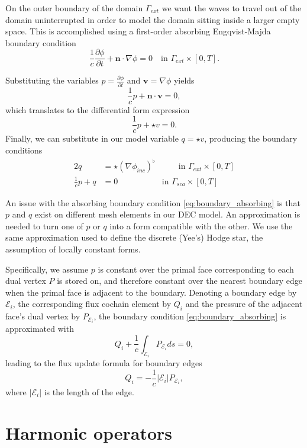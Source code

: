 \documentclass[utf8,english]{gradu3}
\begin{document}
On the outer boundary of the domain $\Gamma_{ext}$
we want the waves to travel out of the domain uninterrupted
in order to model the domain sitting inside a larger empty space.
This is accomplished using a first-order absorbing Engqvist-Majda boundary condition
\parencite{engquist_absorbing_1977}
\[
  \frac{1}{c}\frac{\partial\phi}{\partial t} + \mathbf{n} \cdot \nabla\phi = 0
  \quad \text{in } \Gamma_{ext} \times [0, T].
\]

Substituting the variables $p = \frac{\partial \phi}{\partial t}$
and $\mathbf{v} = \nabla \phi$ yields
\[
  \frac{1}{c}p + \mathbf{n} \cdot \mathbf{v} = 0,
\]
which translates to the differential form expression
\[
  \frac{1}{c}p + \star v = 0.
\]
Finally, we can substitute in our model variable $q = \star v$,
producing the boundary conditions
\begin{alignat}{2}
  \label{eq:boundary_dirichlet}
  q &= \star(\nabla \phi_{inc})^{\flat} & \qquad \text{in } \Gamma_{ext} \times [0, T] \\
  \label{eq:boundary_absorbing}
  \frac{1}{c} p + q &= 0 & \text{in } \Gamma_{sca} \times [0, T]
\end{alignat}

An issue with the absorbing boundary condition \eqref{eq:boundary_absorbing}
is that $p$ and $q$ exist on different mesh elements in our DEC model.
An approximation is needed to turn one of $p$ or $q$ into a form compatible with the other.
We use the same approximation used to define the discrete (Yee's) Hodge star,
the assumption of locally constant forms.

Specifically, we assume $p$ is constant over the primal face corresponding
to each dual vertex $P$ is stored on,
and therefore constant over the nearest boundary edge
when the primal face is adjacent to the boundary.
Denoting a boundary edge by $\mathcal{E}_i$,
the corresponding flux cochain element by $Q_i$
and the pressure of the adjacent face's dual vertex by $P_{\mathcal{E}_i}$,
the boundary condition \eqref{eq:boundary_absorbing} is approximated with
\[
  Q_i + \frac{1}{c} \int_{\mathcal{E}_i} P_{\mathcal{E}_i} ds = 0,
\]
leading to the flux update formula for boundary edges
\begin{equation}
  Q_i = -\frac{1}{c} |\mathcal{E}_i| P_{\mathcal{E}_i},
\end{equation}
where $|\mathcal{E}_i|$ is the length of the edge.


\section{Harmonic operators}\label{sec:harmonic_operators}
\end{document}

